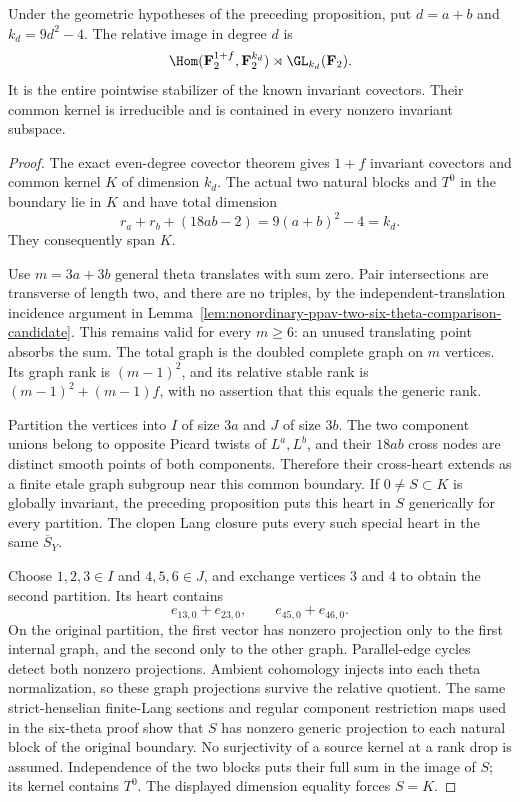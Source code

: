 \begin{theorem}
\label{thm:nonordinary-even-addition-candidate}
Under the geometric hypotheses of the preceding proposition,
put $d=a+b$ and $k_d=9d^2-4$. The relative image in degree $d$ is
\[
       \Hom(\mathbf F_2^{1+f},\mathbf F_2^{k_d})
                               \rtimes\GL_{k_d}(\mathbf F_2).
\]
It is the entire pointwise stabilizer of the known invariant
covectors. Their common kernel is irreducible and is contained
in every nonzero invariant subspace.
\end{theorem}
\begin{proof}
The exact even-degree covector theorem gives $1+f$ invariant
covectors and common kernel $K$ of dimension $k_d$. The actual
two natural blocks and $T^0$ in the boundary lie in $K$ and
have total dimension
\[
       r_a+r_b+(18ab-2)=9(a+b)^2-4=k_d.
\]
They consequently span $K$.

Use $m=3a+3b$ general theta translates with sum zero. Pair
intersections are transverse of length two, and there are no
triples, by the independent-translation incidence argument in
Lemma~\ref{lem:nonordinary-ppav-two-six-theta-comparison-candidate}.
This remains valid for every $m\ge6$: an unused translating
point absorbs the sum. The total graph is the doubled complete
graph on $m$ vertices. Its graph rank is $(m-1)^2$, and its
relative stable rank is $(m-1)^2+(m-1)f$, with no assertion that
this equals the generic rank.

Partition the vertices into $I$ of size $3a$ and $J$ of size
$3b$. The two component unions belong to opposite Picard
twists of $L^a,L^b$, and their $18ab$ cross nodes are distinct
smooth points of both components. Therefore their cross-heart
extends as a finite etale graph subgroup near this common
boundary. If $0\ne S\subset K$ is globally invariant, the
preceding proposition puts this heart in $S$ generically for
every partition. The clopen Lang closure puts every such
special heart in the same $\overline S_Y$.

Choose $1,2,3\in I$ and $4,5,6\in J$, and exchange vertices
$3$ and $4$ to obtain the second partition. Its heart contains
\[
                  e_{13,0}+e_{23,0},\qquad
                  e_{45,0}+e_{46,0}.
\]
On the original partition, the first vector has nonzero
projection only to the first internal graph, and the second
only to the other graph. Parallel-edge cycles detect both
nonzero projections. Ambient cohomology injects into each
theta normalization, so these graph projections survive the
relative quotient. The same strict-henselian finite-Lang
sections and regular component restriction maps used in the
six-theta proof show that $S$ has nonzero generic projection
to each natural block of the original boundary. No surjectivity
of a source kernel at a rank drop is assumed. Independence
of the two blocks puts their full sum in the image of $S$;
its kernel contains $T^0$. The displayed dimension equality
forces $S=K$.


\end{proof}
